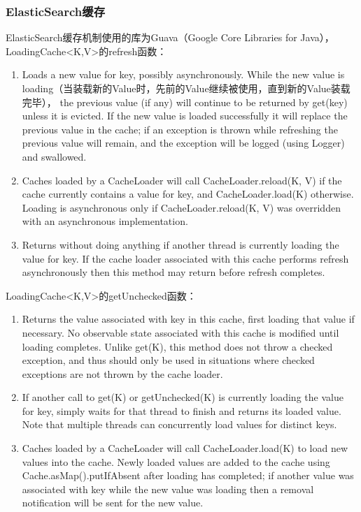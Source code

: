 \subsubsection{ElasticSearch缓存}
\par ElasticSearch缓存机制使用的库为Guava（Google Core Libraries for Java），LoadingCache<K,V>的refresh函数：
\begin{enumerate}[(1)]
\item Loads a new value for key, possibly asynchronously. While the new value is loading（当装载新的Value时，先前的Value继续被使用，直到新的Value装载完毕）， the previous value (if any) will continue to be returned by get(key) unless it is evicted. If the new value is loaded successfully it will replace the previous value in the cache; if an exception is thrown while refreshing the previous value will remain, and the exception will be logged (using Logger) and swallowed.
\item Caches loaded by a CacheLoader will call CacheLoader.reload(K, V) if the cache currently contains a value for key, and CacheLoader.load(K) otherwise. Loading is asynchronous only if CacheLoader.reload(K, V) was overridden with an asynchronous implementation. 
\item Returns without doing anything if another thread is currently loading the value for key. If the cache loader associated with this cache performs refresh asynchronously then this method may return before refresh completes.
\end{enumerate}
\par LoadingCache<K,V>的getUnchecked函数：
\begin{enumerate}[(1)]
\item Returns the value associated with key in this cache, first loading that value if necessary. No observable state associated with this cache is modified until loading completes. Unlike get(K), this method does not throw a checked exception, and thus should only be used in situations where checked exceptions are not thrown by the cache loader.
\item If another call to get(K) or getUnchecked(K) is currently loading the value for key, simply waits for that thread to finish and returns its loaded value. Note that multiple threads can concurrently load values for distinct keys.
\item Caches loaded by a CacheLoader will call CacheLoader.load(K) to load new values into the cache. Newly loaded values are added to the cache using Cache.asMap().putIfAbsent after loading has completed; if another value was associated with key while the new value was loading then a removal notification will be sent for the new value.
\end{enumerate}
